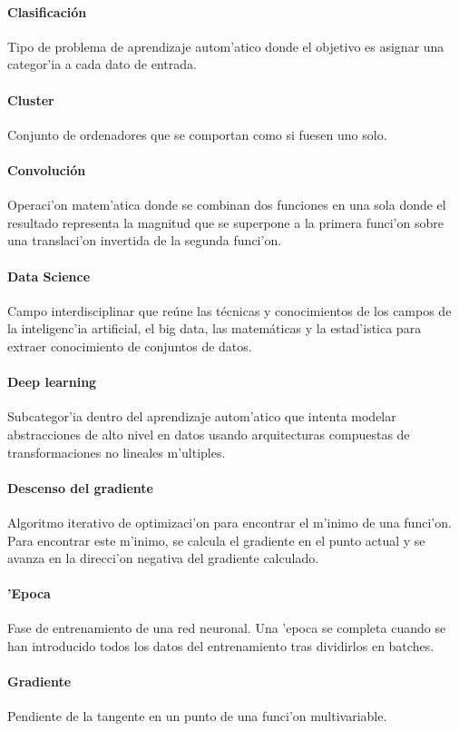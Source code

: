 \paragraph*{Clasificación} Tipo de problema de aprendizaje autom'atico donde el objetivo es asignar una categor'ia a cada dato de entrada.
\paragraph*{Cluster} Conjunto de ordenadores que se comportan como si fuesen uno solo.
\paragraph*{Convolución} Operaci'on matem'atica donde se combinan dos funciones en una sola donde el resultado representa la magnitud que se superpone a la primera funci'on sobre una translaci'on invertida de la segunda funci'on.
\paragraph*{Data Science} Campo interdisciplinar que reúne las técnicas y conocimientos de los campos de la inteligenc'ia artificial, el big data, las matemáticas y la estad'istica para extraer conocimiento de conjuntos de datos.
\paragraph*{Deep learning} Subcategor'ia dentro del aprendizaje autom'atico que intenta modelar abstracciones de alto nivel en datos usando arquitecturas compuestas de transformaciones no lineales m'ultiples.
\paragraph*{Descenso del gradiente} Algoritmo iterativo de optimizaci'on para encontrar el m'inimo de una funci'on. Para encontrar este m'inimo, se calcula el gradiente en el punto actual y se avanza en la direcci'on negativa del gradiente calculado.
\paragraph*{'Epoca} Fase de entrenamiento de una red neuronal. Una 'epoca se completa cuando se han introducido todos los datos del entrenamiento tras dividirlos en batches.
\paragraph*{Gradiente} Pendiente de la tangente en un punto de una funci'on multivariable.
